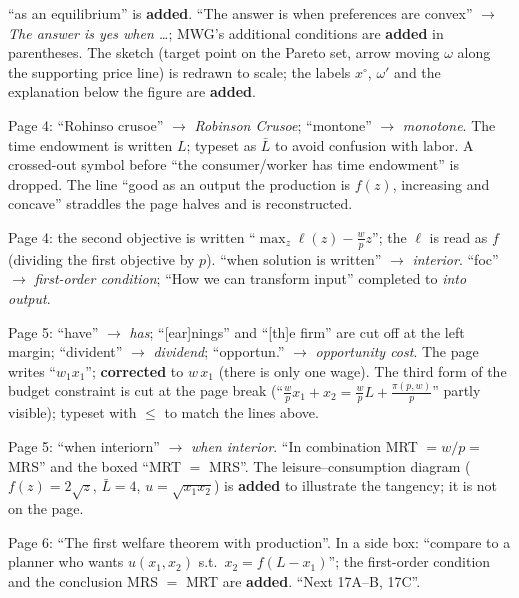 \documentclass[11pt]{article}
\begin{document}
\begin{transcriptnotes}
        ``as an equilibrium'' is \textbf{added}. ``The answer is when preferences are
        convex'' $\to$ \emph{The answer is yes when \ldots}; MWG's additional conditions
        are \textbf{added} in parentheses. The sketch (target point on the Pareto set,
        arrow moving $\omega$ along the supporting price line) is redrawn to scale; the
        labels $x^\circ$, $\omega'$ and the explanation below the figure are
        \textbf{added}.
  \item Page 4: ``Rohinso crusoe'' $\to$ \emph{Robinson Crusoe}; ``montone''
        $\to$ \emph{monotone}. The time endowment is written $L$; typeset as $\bar L$ to
        avoid confusion with labor. A crossed-out symbol before ``the consumer/worker has
        time endowment'' is dropped. The line ``good as an output the production is
        $f(z)$, increasing and concave'' straddles the page halves and is reconstructed.
  \item Page 4: the second objective is written ``$\max_z \ell(z)-\frac{w}{p}z$''; the
        $\ell$ is read as $f$ (dividing the first objective by $p$). ``when solution is
        written'' $\to$ \emph{interior}. ``foc'' $\to$ \emph{first-order condition};
        ``How we can transform input'' completed to \emph{into output}.
  \item Page 5: ``have'' $\to$ \emph{has}; ``[ear]nings'' and ``[th]e firm'' are cut off at
        the left margin; ``divident'' $\to$ \emph{dividend}; ``opportun.'' $\to$
        \emph{opportunity cost}. The page writes ``$w_1x_1$''; \textbf{corrected} to
        $w\,x_1$ (there is only one wage). The third form of the budget constraint is cut
        at the page break (``$\frac{w}{p}x_1+x_2 = \frac{w}{p}L+\frac{\pi(p,w)}{p}$''
        partly visible); typeset with $\le$ to match the lines above.
  \item Page 5: ``when interiorn'' $\to$ \emph{when interior}. ``In combination
        MRT $=w/p=$ MRS'' and the boxed ``MRT $=$ MRS''. The leisure--consumption diagram
        ($f(z)=2\sqrt z$, $\bar L=4$, $u=\sqrt{x_1x_2}$) is \textbf{added} to illustrate
        the tangency; it is not on the page.
  \item Page 6: ``The first welfare theorem with production''. In a side box: ``compare to a
        planner who wants $u(x_1,x_2)$ s.t.\ $x_2=f(L-x_1)$''; the first-order condition
        and the conclusion MRS $=$ MRT are \textbf{added}. ``Next 17A--B, 17C''.
\end{transcriptnotes}
\end{document}
